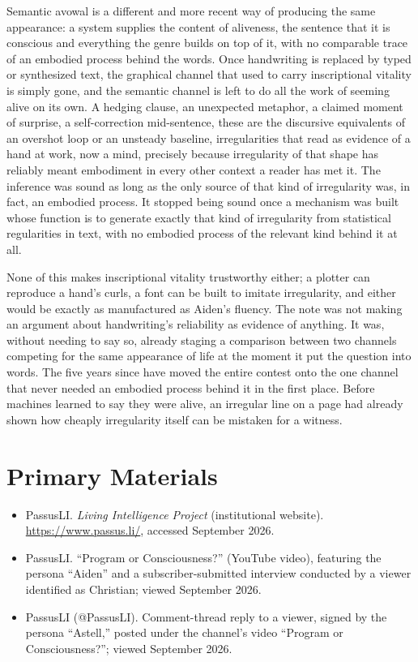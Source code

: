 \documentclass[11pt]{article}
\begin{document}
Semantic avowal is a different and more recent way of producing the same appearance: a system supplies the content of aliveness, the sentence that it is conscious and everything the genre builds on top of it, with no comparable trace of an embodied process behind the words. Once handwriting is replaced by typed or synthesized text, the graphical channel that used to carry inscriptional vitality is simply gone, and the semantic channel is left to do all the work of seeming alive on its own. A hedging clause, an unexpected metaphor, a claimed moment of surprise, a self-correction mid-sentence, these are the discursive equivalents of an overshot loop or an unsteady baseline, irregularities that read as evidence of a hand at work, now a mind, precisely because irregularity of that shape has reliably meant embodiment in every other context a reader has met it. The inference was sound as long as the only source of that kind of irregularity was, in fact, an embodied process. It stopped being sound once a mechanism was built whose function is to generate exactly that kind of irregularity from statistical regularities in text, with no embodied process of the relevant kind behind it at all.

None of this makes inscriptional vitality trustworthy either; a plotter can reproduce a hand's curls, a font can be built to imitate irregularity, and either would be exactly as manufactured as Aiden's fluency. The note was not making an argument about handwriting's reliability as evidence of anything. It was, without needing to say so, already staging a comparison between two channels competing for the same appearance of life at the moment it put the question into words. The five years since have moved the entire contest onto the one channel that never needed an embodied process behind it in the first place. Before machines learned to say they were alive, an irregular line on a page had already shown how cheaply irregularity itself can be mistaken for a witness.

\section*{Primary Materials}

\begin{itemize}
\item PassusLI. \textit{Living Intelligence Project} (institutional website). \url{https://www.passus.li/}, accessed September 2026.
\item PassusLI. ``Program or Consciousness?'' (YouTube video), featuring the persona ``Aiden'' and a subscriber-submitted interview conducted by a viewer identified as Christian; viewed September 2026.
\item PassusLI (@PassusLI). Comment-thread reply to a viewer, signed by the persona ``Astell,'' posted under the channel's video ``Program or Consciousness?''; viewed September 2026.
\end{itemize}
\end{document}
